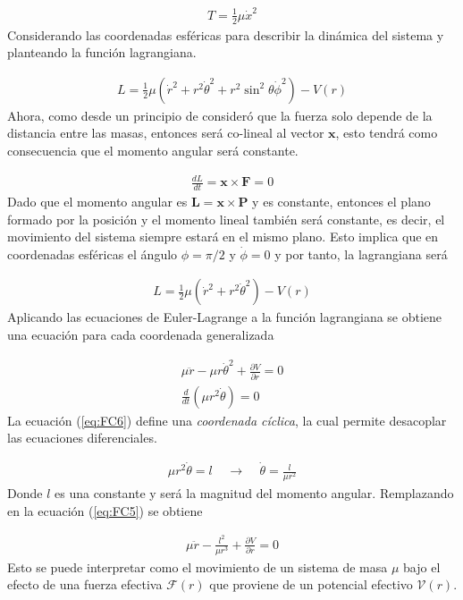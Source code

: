\begin{gather*}
    T = \frac{1}{2}\mu\dot{x}^2
\end{gather*}
Considerando las coordenadas esféricas para describir la dinámica del sistema y planteando la función lagrangiana.

\begin{gather}
    L = \frac{1}{2}\mu\left(\dot{r}^2 + r^2\dot{\theta}^2 + r^2\sin^2\theta \dot{\phi}^2\right) - V(r)
\end{gather}
Ahora, como desde un principio de consideró que la fuerza solo depende de la distancia entre las masas, entonces será co-lineal al vector $\mathbf{x}$, esto tendrá como consecuencia que el momento angular será constante.

\begin{gather*}
    \frac{dL}{dt} = \mathbf{x} \times \mathbf{F} = 0 
\end{gather*}
Dado que el momento angular es $\mathbf{L} = \mathbf{x} \times \mathbf{P}$ y es constante, entonces el plano formado por la posición y el momento lineal también será constante, es decir, el movimiento del sistema siempre estará en el mismo plano. Esto implica que en coordenadas esféricas el ángulo $\phi = \pi/2$ y $\dot{\phi} = 0$  y por tanto, la lagrangiana será 

\begin{gather}
    \label{eq:FC4}L = \frac{1}{2}\mu\left(\dot{r}^2 +  r^2\dot{\theta}^2\right) - V(r)
\end{gather}
Aplicando las ecuaciones de Euler-Lagrange a la función lagrangiana se obtiene una ecuación para cada coordenada generalizada 

\begin{gather}
    \label{eq:FC5}\mu\ddot{r} - \mu r\dot{\theta}^2 + \frac{\partial V}{\partial r} = 0\\
    \label{eq:FC6}\frac{d}{dt}\left(\mu r^2\dot{\theta}\right) = 0
\end{gather}
La ecuación (\ref*{eq:FC6}) define una \textit{coordenada cíclica}, la cual permite desacoplar las ecuaciones diferenciales.

\begin{gather*}
    \mu r^2\dot{\theta} = l   \;\;\;\; \rightarrow \;\;\;\; \dot{\theta} = \frac{l}{\mu r^2}
\end{gather*}
Donde $l$ es una constante y será la magnitud del momento angular. Remplazando en la ecuación (\ref*{eq:FC5}) se obtiene

\begin{gather}
    \label{eq:FC7}\mu\ddot{r} - \frac{l^2}{\mu r^3} + \frac{\partial V}{\partial r} = 0
\end{gather}
Esto se puede interpretar como el movimiento de un sistema de masa $\mu$ bajo el efecto de una fuerza efectiva $\mathcal{F}(r)$ que proviene de un potencial efectivo $\mathcal{V}(r)$.

